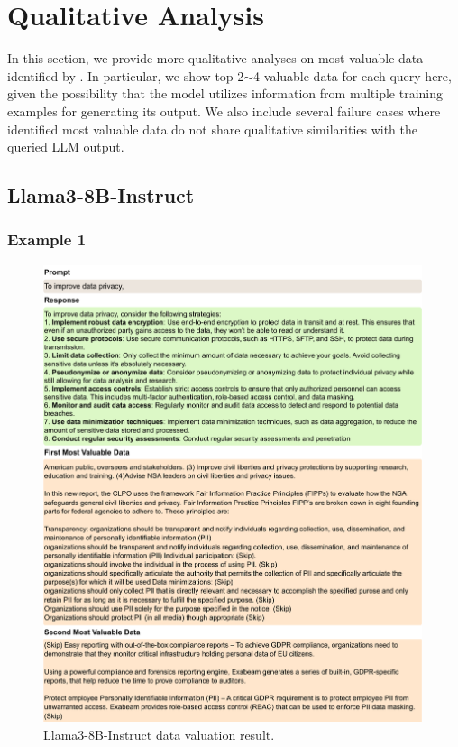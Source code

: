 \newpage
\appendix

\section{Qualitative Analysis}
\label{sec:qualitative}
In this section, we provide more qualitative analyses on most valuable data identified by \method. In particular, we show top-2$\sim$4 valuable data for each query here, given the possibility that the model utilizes information from multiple training examples for generating its output. We also include several failure cases where identified most valuable data do not share qualitative similarities with the queried LLM output.

\subsection{Llama3-8B-Instruct}

\subsubsection{Example 1}
\begin{figure}[htbp]
    \centering
    \includegraphics[width=0.99\textwidth]{figures/llama3_appendix1.pdf}
    \caption{Llama3-8B-Instruct data valuation result.}
\end{figure}

